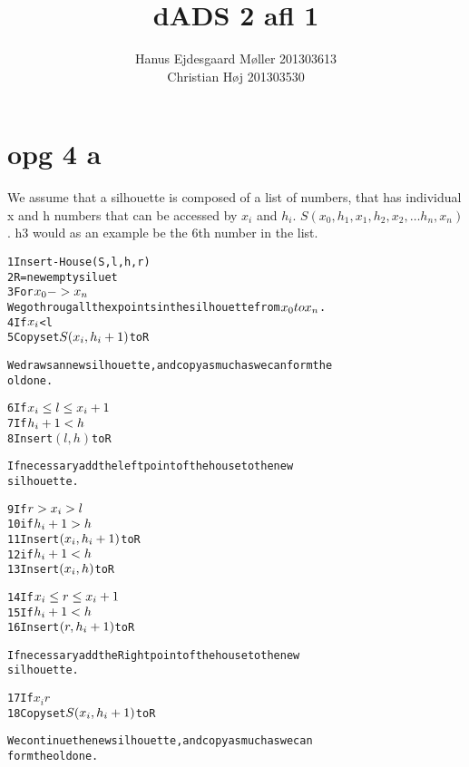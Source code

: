 \documentclass{article}
\title{dADS 2 afl 1}
\author{
	Hanus Ejdesgaard Møller 201303613 \\
	Christian Høj 201303530}
\begin{document}
\maketitle
\section*{opg 4 a}
We assume that a silhouette is composed of a list of numbers, that has individual x and h numbers that can be accessed by $x_i$ and $h_i$. $S(x_0, h_1, x_1, h_2, x_2, … h_n, x_n)$. h3 would as an example be the 6th number in the list. 

\begin{alltt}
1   Insert-House(S, l, h, r)
2   R = new empty siluet
3   For \(x\sb{0} -> x\sb{n}\)
We go throug all the x points in the silhouette from \(x\sb{0} to x\sb{n}\).
4       If \(x\sb{i}\)<l
5           Copy set \(S(x\sb{i},h\sb{i}+1)\) to R

We draws an new silhouette,and copy as much as we can form the
old one.

6       If \(x\sb{i} \leq l \leq x\sb{i}+1\)
7          If \(h\sb{i}+1<h\)
8              Insert \((l,h)\) to R

If necessary add the left point of the house to the new
silhouette.

9       If \(r > x\sb{i}>l\)
10          if \(h\sb{i}+1>h\)
11              Insert \((x\sb{i},h\sb{i}+1)\) to R
12          if \(h\sb{i}+1 < h\)
13              Insert \((x\sb{i} , h)\) to R

14      If \(x\sb{i} \leq r \leq x\sb{i}+1\)
15          If \(h\sb{i}+1<h\)
16              Insert \((r,h\sb{i}+1)\) to R  

If necessary add the Right point of the house to the new
silhouette.

17      If \(x_i r\)
18          Copy set \(S(x\sb{i} , h\sb{i}+1)\) to R

We continue the new silhouette, and copy as much as we can
form the old one.
\end{alltt}
\end{document}

